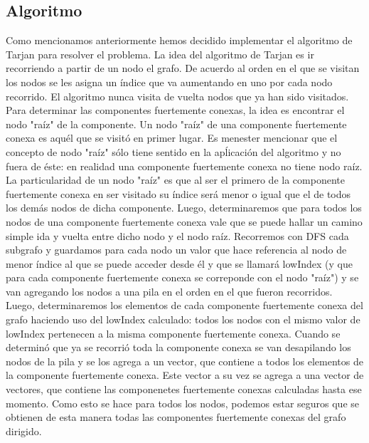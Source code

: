 \subsection{Algoritmo} 

\quad Como mencionamos anteriormente hemos decidido implementar el algoritmo de Tarjan para resolver el problema. La idea del algoritmo de Tarjan es ir recorriendo a partir de un nodo el grafo. De acuerdo al orden en el que se visitan los nodos se les asigna un índice que va aumentando en uno por cada nodo recorrido. El algoritmo nunca visita de vuelta nodos que ya han sido visitados. Para determinar las componentes fuertemente conexas, la idea es encontrar el nodo "raíz" de la componente. Un nodo "raíz" de una componente fuertemente conexa es aquél que se visitó en primer lugar. Es menester mencionar que el concepto de nodo "raíz" sólo tiene sentido en la apĺicación del algoritmo y no fuera de éste: en realidad una componente fuertemente conexa no tiene nodo raíz. La particularidad de un nodo "raíz" es que al ser el primero de la componente fuertemente conexa en ser visitado su índice será menor o igual que el de todos los demás nodos de dicha componente. Luego, determinaremos que para todos los nodos de una componente fuertemente conexa vale que se puede hallar un camino simple ida y vuelta entre dicho nodo y el nodo raíz. 
\quad Recorremos con DFS cada subgrafo y guardamos para cada nodo un valor que hace referencia al nodo de menor índice al que se puede acceder desde él y que se llamará lowIndex (y que para cada componente fuertemente conexa se correponde con el nodo "raíz") y se van  agregando los nodos a una pila en el orden en el que fueron recorridos. Luego, determinaremos los elementos de cada componente fuertemente conexa del grafo haciendo uso del lowIndex calculado: todos los nodos con el mismo valor de lowIndex pertenecen a la misma componente fuertemente conexa. Cuando se determinó que ya se recorrió toda la componente conexa se van desapilando los nodos de la pila y se los agrega a un vector, que contiene a todos los elementos de la componente fuertemente conexa. Este vector a su vez se agrega a una vector de vectores, que contiene las componenetes fuertemente conexas calculadas hasta ese momento.  Como esto se hace para todos los nodos, podemos estar seguros que se obtienen de esta manera todas las componentes fuertemente conexas del grafo dirigido.

